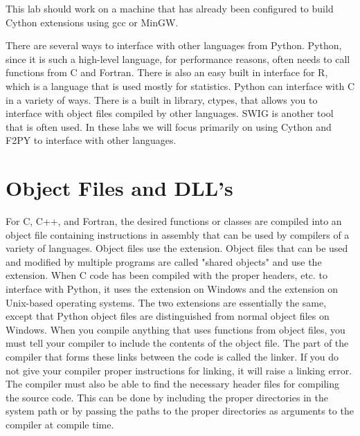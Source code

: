 \label{lab:cythonwrap}


This lab should work on a machine that has already been configured to build Cython extensions using gcc or MinGW.

There are several ways to interface with other languages from Python.
Python, since it is such a high-level language, for performance reasons, often needs to call functions from C and Fortran.
There is also an easy built in interface for R, which is a language that is used mostly for statistics.
Python can interface with C in a variety of ways.
There is a built in library, ctypes, that allows you to interface with object files compiled by other languages.
SWIG is another tool that is often used.
In these labs we will focus primarily on using Cython and F2PY to interface with other languages.

\section*{Object Files and DLL's}

For C, C++, and Fortran, the desired functions or classes are compiled into an object file containing instructions in assembly that can be used by compilers of a variety of languages.
Object files use the  extension.
Object files that can be used and modified by multiple programs are called "shared objects" and use the  extension.
When C code has been compiled with the proper headers, etc. to interface with Python, it uses the  extension on Windows and the  extension on Unix-based operating systems.
The two extensions are essentially the same, except that Python object files are distinguished from normal object files on Windows.
When you compile anything that uses functions from object files, you must tell your compiler to include the contents of the object file.
The part of the compiler that forms these links between the code is called the linker.
If you do not give your compiler proper instructions for linking, it will raise a linking error.
The compiler must also be able to find the necessary header files for compiling the source code.
This can be done by including the proper directories in the system path or by passing the paths to the proper directories as arguments to the compiler at compile time.

